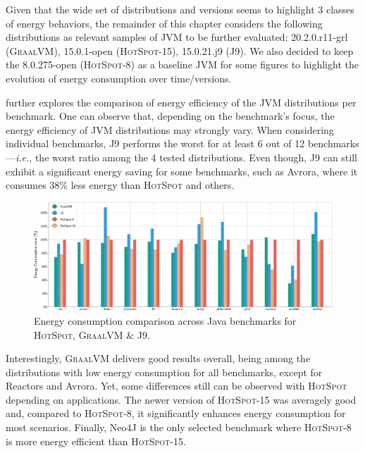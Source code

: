 
Given that the wide set of distributions and versions seems to highlight 3 classes of energy behaviors, the remainder of this chapter considers the following distributions as relevant samples of JVM to be further evaluated: \textsf{20.2.0.r11-grl} (\textsc{GraalVM}), \textsf{15.0.1-open} (\textsc{HotSpot-15}), \textsf{15.0.21.j9} (\textsc{J9}).
We also decided to keep the \textsf{8.0.275-open} (\textsc{HotSpot-8}) as a baseline JVM for some figures to highlight the evolution of energy consumption over time/versions.

 further explores the comparison of energy efficiency of the JVM distributions per benchmark.
One can observe that, depending on the benchmark's focus, the energy efficiency of JVM distributions may strongly vary.
When considering individual benchmarks, \textsc{J9} performs the worst for at least 6 out of 12 benchmarks---\emph{i.e.}, the worst ratio among the 4 tested distributions.
Even though, \textsc{J9} can still exhibit a significant energy saving for some benchmarks, such as \textsf{Avrora}, where it consumes 38\% less energy than \textsc{HotSpot} and others.

\begin{figure}%
    \includegraphics[width=.87\linewidth]{imgs/bar_plot_all_basedon8}
    \centering
    \captionsetup{justification=centering}
    \caption{Energy consumption comparison across Java benchmarks for \textsc{HotSpot}, \textsc{GraalVM} \& \textsc{J9}.}
    \label{fig:all_benchs}
\end{figure}

Interestingly, \textsc{GraalVM} delivers good results overall, being among the distributions with low energy consumption for all benchmarks, except for \textsf{Reactors} and \textsf{Avrora}.
Yet, some differences still can be observed with \textsc{HotSpot} depending on applications.
The newer version of \textsc{HotSpot-15} was averagely good and, compared to \textsc{HotSpot-8}, it significantly enhances energy consumption for most scenarios.
Finally, \textsf{Neo4J} is the only selected benchmark where \textsc{HotSpot-8} is more energy efficient than \textsc{HotSpot-15}.


